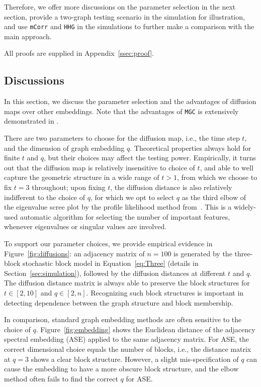 \documentclass[11pt]{article}
\theoremstyle{definition}
\begin{document}
Therefore, we offer more discussions on the parameter selection in the next section, provide a two-graph testing scenario in the simulation for illustration, and use \texttt{mCorr} and \texttt{HHG} in the simulations to further make a comparison with the main approach.

All proofs are supplied in Appendix~\ref{ssec:proof}.

\subsection{Discussions}
\label{ss:dis}
 
In this section, we discuss the parameter selection and the advantages of diffusion maps over other embeddings. Note that the advantages of \texttt{MGC} is extensively demonstrated in \cite{shen2016discovering}.

There are two parameters to choose for the diffusion map, i.e., the time step $t$, and the dimension of graph embedding $q$. Theoretical properties always hold for finite $t$ and $q$, but their choices may affect the testing power. Empirically, it turns out that the diffusion map is relatively insensitive to choice of $t$, and able to well capture the geometric structure in a wide range of $t>1$, from which we choose to fix $t=3$ throughout; upon fixing $t$, the diffusion distance is also relatively indifferent to the choice of $q$, for which we opt to select $q$ as the third elbow of the eigenvalue scree plot by the profile likelihood method from~\cite{ZhuGhodsi2006}. This is a widely-used automatic algorithm for selecting the number of important features, whenever eigenvalues or singular values are involved. 

To support our parameter choices, we provide empirical evidence in Figure~\ref{fig:diffusions}: an adjacency matrix of $n=100$ is generated by the three-block stochastic block model in Equation~\ref{eq:Three} (details in Section~\ref{sec:simulation}), followed by the diffusion distances at different $t$ and $q$. The diffusion distance matrix is always able to preserve the block structures for $t \in [2,10]$ and $q \in [2,n]$. Recognizing such block structures is important in detecting dependence between the graph structure and block membership.

In comparison, standard graph embedding methods are often sensitive to the choice of $q$. Figure~\ref{fig:embedding} shows the Euclidean distance of the adjacency spectral embedding (ASE) \cite{SussmanEtAl2012} applied to the same adjacency matrix. For ASE, the correct dimensional choice equals the number of blocks, i.e., the distance matrix at $q=3$ shows a clear block structure. However, a slight mis-specification of $q$ can cause the embedding to have a more obscure block structure, and the elbow method often fails to find the correct $q$ for ASE.
\end{document}

